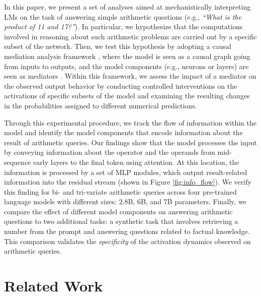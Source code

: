 \documentclass[11pt]{article}
\begin{document}
In this paper, we present a set of analyses aimed at mechanistically interpreting LMs on the task of answering simple arithmetic questions (e.g., \textit{``What is the product of 11 and 17?''}).
In particular, we hypothesize that the computations involved in reasoning about such arithmetic problems are carried out by a specific subset of the network.
Then, we test this hypothesis by adopting a causal mediation analysis framework \cite{vig2020investigating, meng2022locating}, where the model is seen as a causal graph going from inputs to outputs, and the model components (e.g., neurons or layers) are seen as mediators \cite{pearl2001direct}. Within this framework, we assess the impact of a mediator on the observed output behavior by conducting controlled interventions on the activations of specific subsets of the model and examining the resulting changes in the probabilities assigned to different numerical predictions.



Through this experimental procedure, we track the flow of information within the model and identify the model components that encode information about the result of arithmetic queries.
Our findings show that the model processes the input by conveying information about the operator and the operands from mid-sequence early layers to the final token using attention. At this location, the information is processed by a set of MLP modules, which output result-related information into the residual stream (shown in Figure \ref{fig:info_flow}).
We verify this finding for bi- and tri-variate arithmetic queries across four pre-trained language models with different sizes: 2.8B, 6B, and 7B parameters.
Finally, we compare the effect of different model components on answering arithmetic questions to two additional tasks: a synthetic task that involves retrieving a number from the prompt and answering questions related to factual knowledge. This comparison validates the \textit{specificity} of the activation dynamics observed on arithmetic queries.



\section{Related Work}
\end{document}
